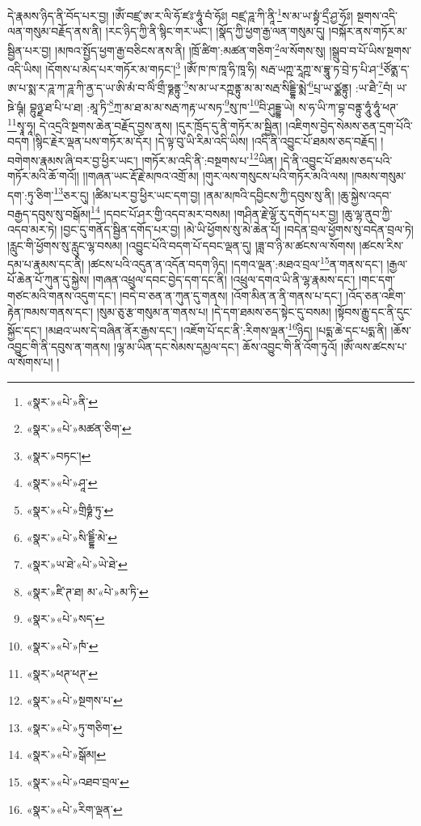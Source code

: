 དེ་རྣམས་ཉིད་ནི་བོད་པར་བྱ། །ཨོཾ་བཛྲ་ཨ་ར་ལི་ཧོ་ཛཿ་ཧཱུཾ་བཾ་ཧོཿ། བཛྲ་ཌཱ་ཀི་ནཱི་\footnote{«སྣར་»«པེ་»ནི་}ས་མ་ཡ་སྟྭཾ་དྲྀ་ཤྱ་ཧོཿ། སྔགས་འདི་ལན་གསུམ་བརྗོད་ནས་ནི། །རང་ཉིད་ཀྱི་ནི་སྙིང་གར་ཡང་། །སྣོད་ཀྱི་ཕྱག་རྒྱ་ལན་གསུམ་དུ། །བསྐོར་ནས་གཏོར་མ་སྦྱིན་པར་བྱ། །མཁའ་སྤྱོད་ཕྱག་རྒྱ་བཅིངས་ནས་ནི། །ཁྲོ་ཚིག་:མཚན་གཅིག་\footnote{«སྣར་»«པེ་»མཚན་ཅིག་}ལ་སོགས་སུ། །སྒྲུབ་བ་པོ་ཡིས་སྔགས་འདི་ཡིས། །དོགས་པ་མེད་པར་གཏོར་མ་གཏང་།\footnote{«སྣར་»བཏང་།} །ཨོཾ་ཁ་ཁ་ཁཱ་ཧི་ཁཱ་ཧི། སརྦ་ཡཀྵ་རཱཀྵ་ས་བྷཱུ་ཏ་བྲེ་ཏ་པི་ཤ་\footnote{«སྣར་»«པེ་»ཤཱ་}ཙོནྨ་ད་ཨ་པ་སྨ་ར་ཌཱ་ཀ་ཌཱ་ཀི་ནྱ་ད་ཡ་ཨི་མཾ་བ་ལིཾ་གྲྀ་ཧྞནྟུ་\footnote{«སྣར་»«པེ་»གྲིཧྞཾ་ཏུ་}ས་མ་ཡ་རཀྵནྟུ་མ་མ་སརྦ་སིདྡྷི་མྨེ་\footnote{«སྣར་»«པེ་»སི་དྡྷིཾ་མེ་}པྲ་ཡ་ཙྪནྟུ། :ཡ་ཐཻ་\footnote{«སྣར་»ཡ་ཐེ་«པེ་»ཡེ་ཐེ་}བཾ། ཡ་ཋེ་ཥྚཾ། བྷུཉྫ་ཐ་པི་པ་ཐ། :མཱ་ཏི་\footnote{«སྣར་»ཛི་ཊ་ཐ། མ་«པེ་»མ་ཏི་}ཀྲ་མ་ཐ་མ་མ་སརྦ་ཀརྟ་ཡ་སཏ་\footnote{«སྣར་»«པེ་»སད་}སུ་ཁ་\footnote{«སྣར་»«པེ་»ཁཾ་}བི་ཤུདྡྷ་ཡེ། ས་ཧ་ཡི་ཀ་བྷ་བནྟུ་ཧཱུཾ་ཧཱུཾ་ཕཊ་\footnote{«སྣར་»ཕཊ་ཕཊ་}སྭཱ་ཧཱ། དེ་འདྲའི་སྔགས་ཆེན་བརྗོད་བྱས་ནས། །དུར་ཁྲོད་དུ་ནི་གཏོར་མ་སྦྱིན། །འཇིགས་བྱེད་སེམས་ཅན་དྲག་པོའི་བདག །སྙིང་རྗེར་ལྡན་པས་གཏོར་མ་དོར། །དེ་ལྟ་བུ་ཡི་རིམ་འདི་ཡིས། །འདི་ནི་འབྱུང་པོ་ཐམས་ཅད་བརྗོད། །བགེགས་རྣམས་ཞི་བར་བྱ་ཕྱིར་ཡང་། །གཏོར་མ་འདི་ནི་:བསྔགས་པ་\footnote{«སྣར་»«པེ་»སྔགས་པ་}ཡིན། །དེ་ནི་འབྱུང་པོ་ཐམས་ཅད་པའི་གཏོར་མའི་ཆོ་གའོ།། །།གཞན་ཡང་རྡོ་རྗེ་མཁའ་འགྲོ་མ། །གུར་ལས་གསུངས་པའི་གཏོར་མའི་ལས། །ཁམས་གསུམ་དག་:ཏུ་ཅིག་\footnote{«སྣར་»«པེ་»ཏུ་གཅིག་}ཅར་དུ། །ཚིམ་པར་བྱ་ཕྱིར་ཡང་དག་བྱ། །ནམ་མཁའི་དབྱིངས་ཀྱི་དབུས་སུ་ནི། །ཆུ་སྐྱེས་འདབ་བརྒྱད་དབུས་སུ་བསྒོམ།\footnote{«སྣར་»«པེ་»སྒོམ།} །དབང་པོ་ཤར་གྱི་འདབ་མར་བསམ། །གཤིན་རྗེ་ལྷོ་རུ་དགོད་པར་བྱ། །ཆུ་ལྷ་ནུབ་ཀྱི་འདབ་མར་ཏེ། །བྱང་དུ་གནོད་སྦྱིན་དགོད་པར་བྱ། །མེ་ཡི་ཕྱོགས་སུ་མེ་ཆེན་པོ། །བདེན་བྲལ་ཕྱོགས་སུ་བདེན་བྲལ་ཏེ། །རླུང་གི་ཕྱོགས་སུ་རླུང་ལྷ་བསམ། །འབྱུང་པོའི་བདག་པོ་དབང་ལྡན་དུ། །ཟླ་བ་ཉི་མ་ཚངས་ལ་སོགས། །ཚངས་རིས་དམ་པ་རྣམས་དང་ནི། །ཚངས་པའི་འདུན་ན་འདོན་བདག་ཉིད། །དགའ་ལྡན་:མཐའ་བྲལ་\footnote{«སྣར་»«པེ་»འཐབ་བྲལ་}ན་གནས་དང་། །རྒྱལ་པོ་ཆེན་པོ་ཀུན་དུ་སྐྱེས། །གཞན་འཕྲུལ་དབང་བྱེད་དག་དང་ནི། །འཕྲུལ་དགའ་ཡི་ནི་ལྷ་རྣམས་དང་། །གང་དག་གཙང་མའི་གནས་འདུག་དང་། །བདེ་བ་ཅན་ན་ཀུན་དུ་གནས། །འོག་མིན་ན་ནི་གནས་པ་དང་། །འོད་ཅན་འཇིག་རྟེན་ཁམས་གནས་དང་། །སུམ་ཅུ་རྩ་གསུམ་ན་གནས་པ། །དེ་དག་ཐམས་ཅད་སྟེང་དུ་བསམ། །སྟོབས་རྒྱུ་དང་ནི་དུང་སྐྱོང་དང་། །མཐའ་ཡས་དེ་བཞིན་ནོར་རྒྱས་དང་། །འཇོག་པོ་དང་ནི་:རིགས་ལྡན་\footnote{«སྣར་»«པེ་»རིག་ལྡན་}ཉིད། །པདྨ་ཆེ་དང་པདྨ་ནི། །ཆོས་འབྱུང་གི་ནི་དབུས་ན་གནས། །ལྷ་མ་ཡིན་དང་སེམས་དམྱལ་དང་། ཆོས་འབྱུང་གི་ནི་འོག་ཏུའོ། །ཨོཾ་ལས་ཚངས་པ་ལ་སོགས་པ། །
